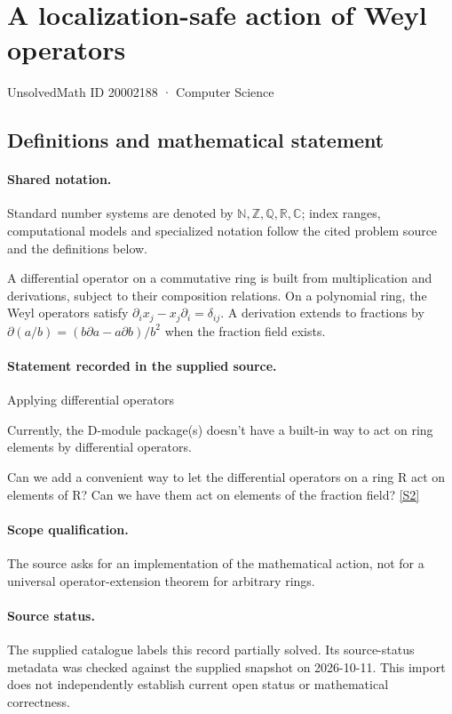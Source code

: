 \documentclass[11pt]{article}
\newcommand{\sref}[2]{\hyperlink{source:#1:#2}{[S#2]}}
\begin{document}
\setcounter{section}{20002187}
\section{A localization-safe action of Weyl operators}\label{20002188}
{\small\sffamily UnsolvedMath ID 20002188 · Computer Science}
\subsection{Definitions and mathematical statement}

\paragraph{Shared notation.}Standard number systems are denoted by $\mathbb N,\mathbb Z,\mathbb Q,\mathbb R,\mathbb C$; index ranges, computational models and specialized notation follow the cited problem source and the definitions below.


A differential operator on a commutative ring is built from multiplication and derivations, subject to their composition relations. On a polynomial ring, the Weyl operators satisfy $\partial_i x_j-x_j\partial_i=\delta_{ij}$. A derivation extends to fractions by $\partial(a/b)=(b\partial a-a\partial b)/b^2$ when the fraction field exists.
\paragraph{Statement recorded in the supplied source.}
Applying differential operators

Currently, the D-module package(s) doesn't have a built-in way to act on ring elements by differential operators.

Can we add a convenient way to let the differential operators on a ring R act on elements of R? Can we have them act on elements of the fraction field? \sref{20002188}{2}
\paragraph{Scope qualification.}
The source asks for an implementation of the mathematical action, not for a universal operator-extension theorem for arbitrary rings.
\paragraph{Source status.}
The supplied catalogue labels this record partially solved. Its source-status metadata was checked against the supplied snapshot on 2026-10-11. This import does not independently establish current open status or mathematical correctness.
\end{document}
